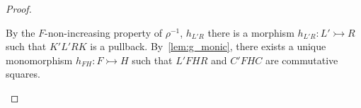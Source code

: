 \begin{proof}
\begin{itemize}
     By the $F$-non-increasing property of $\rho^{-1}$,  
     $h_{L'R}$ 
     there is a morphism $h_{L'R}:L' \rightarrowtail R$ such that $K'L'RK$ is a pullback.
        By~\autoref{lem:g_monic}, there exists a unique monomorphism $h_{FH}:F \rightarrowtail H$ such that $L'FHR$ and $C'FHC$ are commutative squares.


\end{itemize}
\end{proof}
